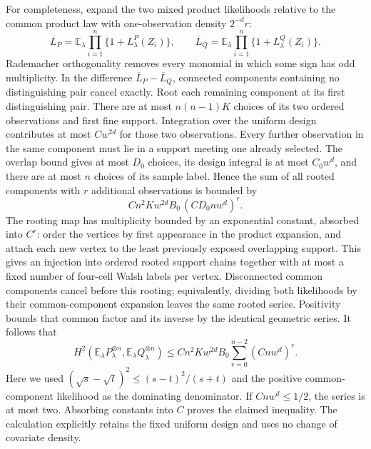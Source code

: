 For completeness, expand the two mixed product likelihoods relative to the common product law with one-observation density \(2^{-d}r\):
\[
\overline L_P=\mathbb E_\lambda\prod_{i=1}^n\{1+L^P_\lambda(Z_i)\},
\qquad
\overline L_Q=\mathbb E_\lambda\prod_{i=1}^n\{1+L^Q_\lambda(Z_i)\}.
\]
Rademacher orthogonality removes every monomial in which some sign has odd multiplicity. In the difference \(\overline L_P-\overline L_Q\), connected components containing no distinguishing pair cancel exactly. Root each remaining component at its first distinguishing pair. There are at most \(n(n-1)K\) choices of its two ordered observations and first fine support. Integration over the uniform design contributes at most \(Cw^{2d}\) for those two observations. Every further observation in the same component must lie in a support meeting one already selected. The overlap bound gives at most \(D_0\) choices, its design integral is at most \(C_0w^d\), and there are at most \(n\) choices of its sample label. Hence the sum of all rooted components with \(r\) additional observations is bounded by
\[
Cn^2Kw^{2d}B_0\,(CD_0nw^d)^r.
\]
The rooting map has multiplicity bounded by an exponential constant, absorbed into \(C^r\): order the vertices by first appearance in the product expansion, and attach each new vertex to the least previously exposed overlapping support. This gives an injection into ordered rooted support chains together with at most a fixed number of four-cell Walsh labels per vertex. Disconnected common components cancel before this rooting; equivalently, dividing both likelihoods by their common-component expansion leaves the same rooted series. Positivity bounds that common factor and its inverse by the identical geometric series. It follows that
\[
H^2\!\left(\mathbb E_\lambda P_\lambda^{\otimes n},\mathbb E_\lambda Q_\lambda^{\otimes n}\right)
\le Cn^2Kw^{2d}B_0
\sum_{r=0}^{n-2}(Cnw^d)^r.
\]
Here we used \((\sqrt s-\sqrt t)^2\le(s-t)^2/(s+t)\) and the positive common-component likelihood as the dominating denominator. If \(Cnw^d\le1/2\), the series is at most two. Absorbing constants into \(C\) proves the claimed inequality. The calculation explicitly retains the fixed uniform design and uses no change of covariate density.